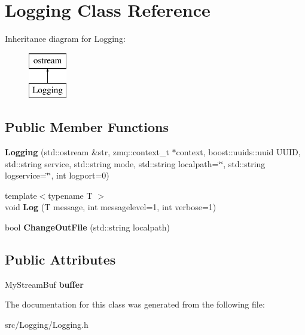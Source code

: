 \hypertarget{classLogging}{\section{Logging Class Reference}
\label{classLogging}
}
Inheritance diagram for Logging\-:\begin{figure}[H]
\begin{center}
\leavevmode
\includegraphics[height=2.000000cm]{classLogging}
\end{center}
\end{figure}
\subsection*{Public Member Functions}
\begin{DoxyCompactItemize}
\item 
\hypertarget{classLogging_ae7cc7299c697019f273b75cbfefff848}{{\bfseries Logging} (std\-::ostream \&str, zmq\-::context\-\_\-t $\ast$context, boost\-::uuids\-::uuid U\-U\-I\-D, std\-::string service, std\-::string mode, std\-::string localpath=\char`\"{}\char`\"{}, std\-::string logservice=\char`\"{}\char`\"{}, int logport=0)}\label{classLogging_ae7cc7299c697019f273b75cbfefff848}

\item 
\hypertarget{classLogging_af7839ee68729b066da269cc012b1fcc9}{{\footnotesize template$<$typename T $>$ }\\void {\bfseries Log} (T message, int messagelevel=1, int verbose=1)}\label{classLogging_af7839ee68729b066da269cc012b1fcc9}

\item 
\hypertarget{classLogging_a7a0c89c152ad81fb41a849ed9d81e429}{bool {\bfseries Change\-Out\-File} (std\-::string localpath)}\label{classLogging_a7a0c89c152ad81fb41a849ed9d81e429}

\end{DoxyCompactItemize}
\subsection*{Public Attributes}
\begin{DoxyCompactItemize}
\item 
\hypertarget{classLogging_a9622376d4c126c163334149cabc98bcc}{My\-Stream\-Buf {\bfseries buffer}}\label{classLogging_a9622376d4c126c163334149cabc98bcc}

\end{DoxyCompactItemize}


The documentation for this class was generated from the following file\-:\begin{DoxyCompactItemize}
\item 
src/\-Logging/Logging.\-h\end{DoxyCompactItemize}

